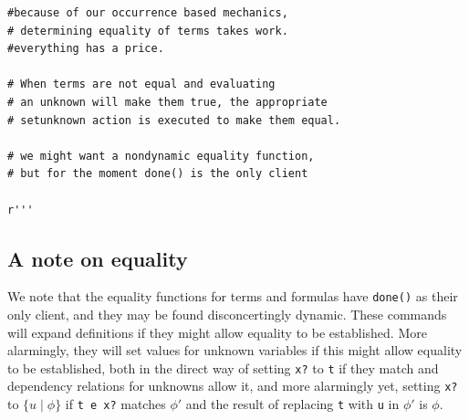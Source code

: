 \documentclass{article}
\begin{document}
\begin{verbatim}
#because of our occurrence based mechanics, 
# determining equality of terms takes work.
#everything has a price.

# When terms are not equal and evaluating 
# an unknown will make them true, the appropriate
# setunknown action is executed to make them equal.

# we might want a nondynamic equality function, 
# but for the moment done() is the only client

r'''

\end{verbatim}

\subsection{A note on equality}

We note that the equality functions for terms and formulas have {\tt done()} as their only client,
and they may be found disconcertingly dynamic.  These commands will expand definitions if they might
allow equality to be established.  More alarmingly, they will set values for unknown variables if this might
allow equality to be established, both in the direct way of setting {\tt x?} to {\tt t} if they match and dependency relations for unknowns allow it, and more alarmingly yet, setting {\tt x?} to $\{u \mid \phi\}$ if {\tt t e x?} matches $\phi'$ and
the result of replacing {\tt t} with {\tt u} in $\phi'$ is $\phi$.
\end{document}
